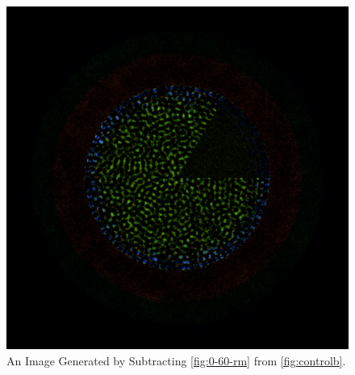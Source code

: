 \begin{figure}[h!]
\centering
\includegraphics[width=0.6\linewidth]{figures/htgr-diff}
\caption{An Image Generated by Subtracting \ref{fig:0-60-rm} from \ref{fig:controlb}.}
\label{fig:htgr-diff}
\end{figure}